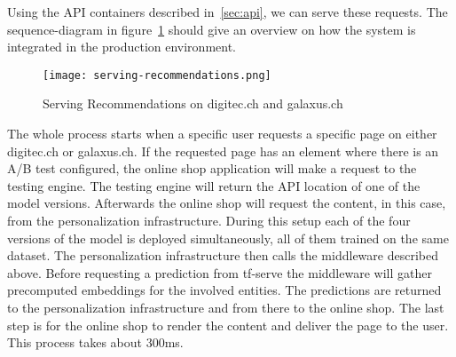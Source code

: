 Using the API containers described in~\ref{sec:api}, we can serve these requests.
The sequence-diagram in figure~\ref{fig:serving_recs} should give an overview on how the system is integrated in the production environment.
\begin{figure}[t]
	\centering
	\captionsetup{width=0.8\textwidth}
    \texttt{[image: serving-recommendations.png]}
    \caption{Serving Recommendations on digitec.ch and galaxus.ch}
    \label{fig:serving_recs}
\end{figure}
The whole process starts when a specific user requests a specific page on either digitec.ch or galaxus.ch.
If the requested page has an element where there is an A/B test configured, the online shop application will make a request to the testing engine.
The testing engine will return the API location of one of the model versions.
Afterwards the online shop will request the content, in this case, from the personalization infrastructure.
During this setup each of the four versions of the model is deployed simultaneously, all of them trained on the same dataset.
The personalization infrastructure then calls the middleware described above.
Before requesting a prediction from tf-serve the middleware will gather precomputed embeddings for the involved entities.
The predictions are returned to the personalization infrastructure and from there to the online shop.
The last step is for the online shop to render the content and deliver the page to the user.
This process takes about 300ms.